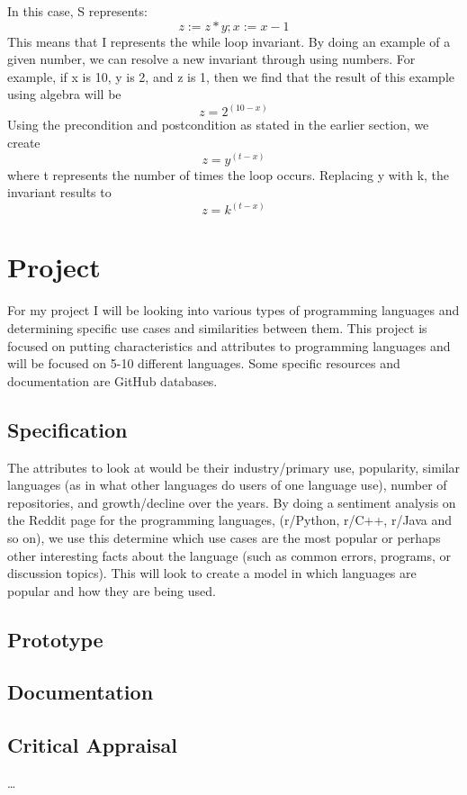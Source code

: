 \documentclass{article}
\theoremstyle{theorem}
\theoremstyle{definition}
\theoremstyle{remark}
\begin{document}
In this case, S represents: $$z := z * y; x:= x - 1$$ This means that I represents the while loop invariant. By doing an example of a given number, we can resolve a new invariant through using numbers. For example, if x is 10, y is 2, and z is 1, then we find that the result of this example using algebra will be $$z = 2^{(10-x)}$$ Using the precondition and postcondition as stated in the earlier section, we create $$z = y^{(t - x)}$$ where t represents the number of times the loop occurs. Replacing y with k, the invariant results to $$z = k^{(t - x)}$$

\section{Project}

For my project I will be looking into various types of programming languages and determining specific use cases and similarities between them. This project is focused on putting characteristics and attributes to programming languages and will be focused on 5-10 different languages. Some specific resources and documentation are GitHub databases.
\subsection{Specification}
The attributes to look at would be their industry/primary use, popularity, similar languages (as in what other languages do users of one language use), number of repositories, and growth/decline over the years. By doing a sentiment analysis on the Reddit page for the programming languages, (r/Python, r/C++, r/Java and so on), we use this determine which use cases are the most popular or perhaps other interesting facts about the language (such as common errors, programs, or discussion topics). This will look to create a model in which languages are popular and how they are being used.

\subsection{Prototype}
\subsection{Documentation}
\subsection{Critical Appraisal}

\ldots
\end{document}
